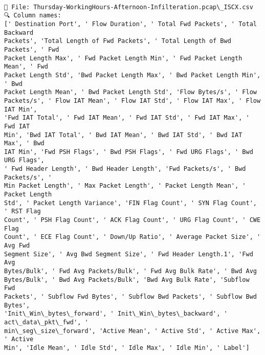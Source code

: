 \documentclass[11pt]{article}
\begin{document}
    \begin{Verbatim}[commandchars=\\\{\}]

📂 File: Thursday-WorkingHours-Afternoon-Infilteration.pcap\_ISCX.csv
🔍 Column names:
[' Destination Port', ' Flow Duration', ' Total Fwd Packets', ' Total Backward
Packets', 'Total Length of Fwd Packets', ' Total Length of Bwd Packets', ' Fwd
Packet Length Max', ' Fwd Packet Length Min', ' Fwd Packet Length Mean', ' Fwd
Packet Length Std', 'Bwd Packet Length Max', ' Bwd Packet Length Min', ' Bwd
Packet Length Mean', ' Bwd Packet Length Std', 'Flow Bytes/s', ' Flow
Packets/s', ' Flow IAT Mean', ' Flow IAT Std', ' Flow IAT Max', ' Flow IAT Min',
'Fwd IAT Total', ' Fwd IAT Mean', ' Fwd IAT Std', ' Fwd IAT Max', ' Fwd IAT
Min', 'Bwd IAT Total', ' Bwd IAT Mean', ' Bwd IAT Std', ' Bwd IAT Max', ' Bwd
IAT Min', 'Fwd PSH Flags', ' Bwd PSH Flags', ' Fwd URG Flags', ' Bwd URG Flags',
' Fwd Header Length', ' Bwd Header Length', 'Fwd Packets/s', ' Bwd Packets/s', '
Min Packet Length', ' Max Packet Length', ' Packet Length Mean', ' Packet Length
Std', ' Packet Length Variance', 'FIN Flag Count', ' SYN Flag Count', ' RST Flag
Count', ' PSH Flag Count', ' ACK Flag Count', ' URG Flag Count', ' CWE Flag
Count', ' ECE Flag Count', ' Down/Up Ratio', ' Average Packet Size', ' Avg Fwd
Segment Size', ' Avg Bwd Segment Size', ' Fwd Header Length.1', 'Fwd Avg
Bytes/Bulk', ' Fwd Avg Packets/Bulk', ' Fwd Avg Bulk Rate', ' Bwd Avg
Bytes/Bulk', ' Bwd Avg Packets/Bulk', 'Bwd Avg Bulk Rate', 'Subflow Fwd
Packets', ' Subflow Fwd Bytes', ' Subflow Bwd Packets', ' Subflow Bwd Bytes',
'Init\_Win\_bytes\_forward', ' Init\_Win\_bytes\_backward', ' act\_data\_pkt\_fwd', '
min\_seg\_size\_forward', 'Active Mean', ' Active Std', ' Active Max', ' Active
Min', 'Idle Mean', ' Idle Std', ' Idle Max', ' Idle Min', ' Label']
    \end{Verbatim}
\end{document}
